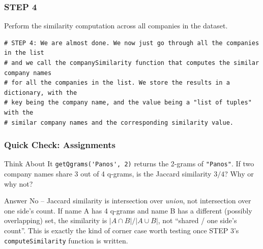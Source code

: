 \begin{frame}[fragile]\frametitle{STEP 4}
Perform the similarity computation across all companies in the dataset.
  \begin{lstlisting}
# STEP 4: We are almost done. We now just go through all the companies in the list
# and we call the companySimilarity function that computes the similar company names
# for all the companies in the list. We store the results in a dictionary, with the 
# key being the company name, and the value being a "list of tuples" with the
# similar company names and the corresponding similarity value.

  \end{lstlisting}
\end{frame}

\begin{frame}[fragile]\frametitle{Quick Check: Assignments}
\begin{block}{Think About It}
\lstinline|getQgrams('Panos', 2)| returns the 2-grams of \texttt{"Panos"}. If two company names
share 3 out of 4 q-grams, is the Jaccard similarity \(3/4\)? Why or why not?
\end{block}
\pause
\begin{block}{Answer}
No -- Jaccard similarity is intersection over \emph{union}, not intersection over one side's
count. If name A has 4 q-grams and name B has a different (possibly overlapping) set, the
similarity is \(|A \cap B| / |A \cup B|\), not ``shared / one side's count''. This is exactly
the kind of corner case worth testing once STEP 3's \lstinline|computeSimilarity| function is
written.
\end{block}
\end{frame}
